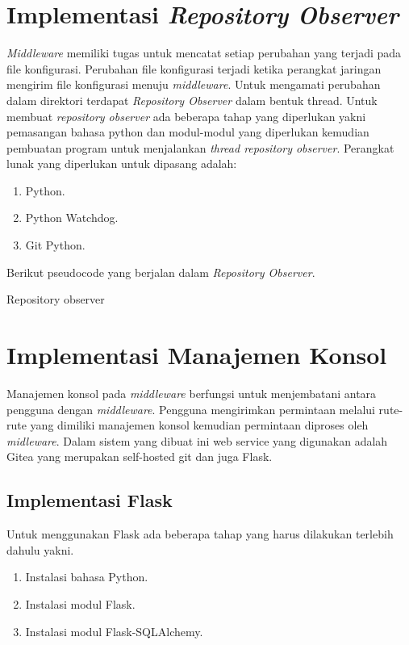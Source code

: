    
   	\section{Implementasi \textit{Repository Observer}}
   		\textit{Middleware} memiliki tugas untuk mencatat setiap perubahan yang terjadi pada file konfigurasi. Perubahan file konfigurasi terjadi ketika perangkat jaringan mengirim file konfigurasi menuju \textit{middleware}. Untuk mengamati perubahan dalam direktori terdapat \textit{Repository Observer} dalam bentuk thread. Untuk membuat \textit{repository observer} ada beberapa tahap yang diperlukan yakni pemasangan bahasa python dan modul-modul yang diperlukan kemudian pembuatan program untuk menjalankan \textit{thread repository observer}. Perangkat lunak yang diperlukan untuk dipasang adalah:
   			\begin{enumerate}
   				\item Python.
   				\item Python Watchdog.
   				\item Git Python.
   			\end{enumerate}	
   		  Berikut pseudocode yang berjalan dalam \textit{Repository Observer}.
   		\begin{algorithm}[H]
   			\caption{Repository observer}
   		\end{algorithm}
   	\section{Implementasi Manajemen Konsol}
   		Manajemen konsol pada \textit{middleware} berfungsi untuk menjembatani antara pengguna dengan \textit{middleware}. Pengguna mengirimkan permintaan melalui rute-rute yang dimiliki manajemen konsol kemudian permintaan diproses oleh \textit{midleware}. Dalam sistem yang dibuat ini web service yang digunakan adalah Gitea yang merupakan self-hosted git dan juga Flask. 
   		
   		\subsection{Implementasi Flask}
   		Untuk menggunakan Flask ada beberapa tahap yang harus dilakukan terlebih dahulu yakni. 
   		\begin{enumerate}
   			\item Instalasi bahasa Python.
   			\item Instalasi modul Flask.
   			\item Instalasi modul Flask-SQLAlchemy.
   		\end{enumerate}
   		
